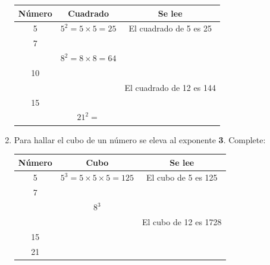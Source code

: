 \documentclass[10pt,twoside]{article}
\begin{document}
\begin{enumerate}
\begin{tabular}{|c|c|c|}\hline
\textbf{Número} & \textbf{Cuadrado} & \textbf{Se lee}\\
\hline 5 & $ 5^2=5\times5=25 $ & El cuadrado de 5 es 25\\
\hline 7 & &\\
\hline & $ 8^2=8\times8=64 $ & \\
\hline 10 & &\\
\hline & & El cuadrado de 12 es 144\\
\hline 15 & & \\
\hline & $ 21^2= $ & \\ \hline
\end{tabular}
\item Para hallar el cubo de un número se eleva al exponente \textbf{3}. Complete:

\begin{tabular}{|c|c|c|}\hline
\textbf{Número} & \textbf{Cubo} & \textbf{Se lee}\\
\hline 5 & $ 5^3=5\times5\times5=125 $ & El cubo de 5 es 125 \\
\hline 7 & & \\
\hline & $ 8^3 $ & \\
\hline & & El cubo de 12 es 1728\\
\hline 15 & & \\
\hline 21 & & \\ \hline
\end{tabular}
\end{enumerate}
\end{document}

